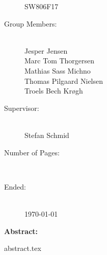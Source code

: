 \begin{titlepage}
\begin{nopagebreak}
\begin{minipage}[t]{0.4\textwidth}
\begin{description}
                    SW806F17
                \item[Group Members:] \hfill\\
                    Jesper Jensen \\
                    Marc Tom Thorgersen \\
                    Mathias Sass Michno \\
                    Thomas Pilgaard Nielsen \\
                    Troels Bech Krøgh
                \item[Supervisor:] \hfill\\
                    Stefan Schmid
                \item[Number of Pages:] \hfill\\
                    \pageref{LastPage}
                \item[Ended:] \hfill\\
                    \today
            \end{description}
        \end{minipage} \hfill
        \begin{minipage}[t]{0.5\textwidth}
            \textbf{Abstract:}\\
            \begin{problemstatement}
                {abstract.tex}
            \end{problemstatement}
        \end{minipage}
    \end{nopagebreak}
\end{titlepage}
